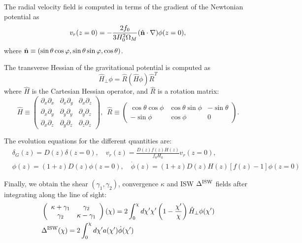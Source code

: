 \documentclass[a4paper,10pt]{article}
\newcommand{\nv}{\hat{\bf n}}
\begin{document}
  The radial velocity field is computed in terms of the gradient of the Newtonian
  potential as
  \begin{equation}
    v_r(z=0)=-\frac{2f_0}{3H_0^2\Omega_M}(\nv\cdot\nabla)\phi(z=0),
  \end{equation}
  where $\nv\equiv(\sin\theta\cos\varphi,\sin\theta\sin\varphi,\cos\theta)$.

  The transverse Hessian of the gravitational potential is computed as
  \begin{equation}
    \hat{H}_\perp\phi=\hat{R}(\hat{H}\phi)\hat{R}^T
  \end{equation}
  where $\hat{H}$ is the Cartesian Hessian operator, and $\hat{R}$ is a rotation
  matrix:
  \begin{equation}
    \hat{H}\equiv\left(
    \begin{array}{ccc}
      \partial_x\partial_x & \partial_x\partial_y & \partial_x\partial_z\\
      \partial_x\partial_y & \partial_y\partial_y & \partial_y\partial_z\\
      \partial_x\partial_z & \partial_y\partial_z & \partial_z\partial_z
    \end{array}\right),
    \hspace{6pt}
    \hat{R}\equiv\left(
    \begin{array}{ccc}
      \cos\theta\cos\phi & \cos\theta\sin\phi & -\sin\theta\\
      -\sin\phi & \cos\phi & 0
    \end{array}
    \right).
  \end{equation}

  The evolution equations for the different quantities are:
  \begin{align}
    &\delta_G(z)=D(z)\delta(z=0),\hspace{12pt}
    v_r(z)=\frac{D(z)f(z)H(z)}{f_0H_0}v_r(z=0),\\
    &\phi(z)=(1+z)D(z)\phi(z=0),\hspace{12pt}
    \dot{\phi}(z)=(1+z)D(z)H(z)[f(z)-1]\phi(z=0)
  \end{align}

  Finally, we obtain the shear $(\gamma_1,\gamma_2)$, convergence $\kappa$
  and ISW $\Delta^{\rm ISW}$ fields after integrating along the line
  of sight:
  \begin{align}
    &\left(
    \begin{array}{cc}
      \kappa+\gamma_1 & \gamma_2\\
      \gamma_2 & \kappa-\gamma_1
    \end{array}\right)(\chi)=
    2\int_0^\chi d\chi'\chi'\left(1-\frac{\chi'}{\chi}\right)\hat{H}_\perp\phi(\chi')\\
    &\Delta^{\rm ISW}(\chi)=2\int_0^\chi d\chi'a(\chi')\dot{\phi}(\chi')
  \end{align}    
\end{document}
